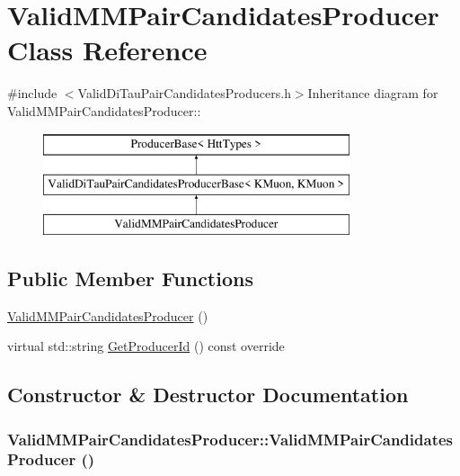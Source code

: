 \hypertarget{classValidMMPairCandidatesProducer}{
\section{ValidMMPairCandidatesProducer Class Reference}
\label{classValidMMPairCandidatesProducer}
}


{\ttfamily \#include $<$ValidDiTauPairCandidatesProducers.h$>$}Inheritance diagram for ValidMMPairCandidatesProducer::\begin{figure}[H]
\begin{center}
\leavevmode
\includegraphics[height=3cm]{classValidMMPairCandidatesProducer}
\end{center}
\end{figure}
\subsection*{Public Member Functions}
\begin{DoxyCompactItemize}
\item 
\hyperlink{classValidMMPairCandidatesProducer_adaabcc7a8ec11e0475e005a4d90aabfb}{ValidMMPairCandidatesProducer} ()
\item 
virtual std::string \hyperlink{classValidMMPairCandidatesProducer_a203cc2509b5cdc61f5867595d4bafae4}{GetProducerId} () const override
\end{DoxyCompactItemize}


\subsection{Constructor \& Destructor Documentation}
\hypertarget{classValidMMPairCandidatesProducer_adaabcc7a8ec11e0475e005a4d90aabfb}{
\subsubsection[{ValidMMPairCandidatesProducer}]{\setlength{\rightskip}{0pt plus 5cm}ValidMMPairCandidatesProducer::ValidMMPairCandidatesProducer ()}}
\label{classValidMMPairCandidatesProducer_adaabcc7a8ec11e0475e005a4d90aabfb}


